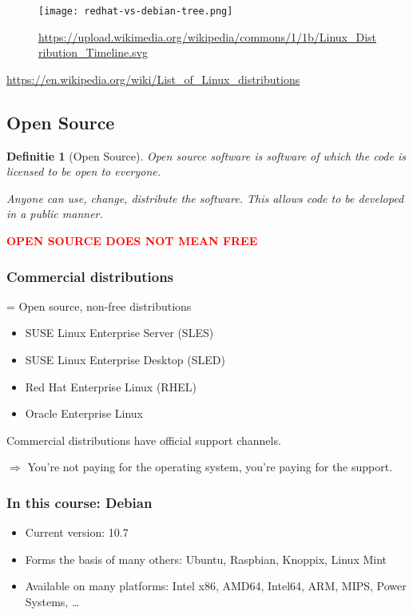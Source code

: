 \documentclass{article}
\newtheorem{theorem}{Definitie}[section]
\begin{document}
\begin{figure}[H]
    \centering
    \texttt{[image: redhat-vs-debian-tree.png]}
    \caption{\url{https://upload.wikimedia.org/wikipedia/commons/1/1b/Linux_Distribution_Timeline.svg}}
\end{figure}

\url{https://en.wikipedia.org/wiki/List_of_Linux_distributions}

\subsection{Open Source}

\begin{theorem}[Open Source]
Open source software is software of which the code is licensed to be open to everyone. 

Anyone can use, change, distribute the software. This allows code to be developed in a public manner.
\end{theorem}

\textbf{\textcolor{red}{OPEN SOURCE DOES NOT MEAN FREE}}

\subsubsection{Commercial distributions}

= Open source, non-free distributions

\begin{itemize}
    \item SUSE Linux Enterprise Server (SLES)
    \item SUSE Linux Enterprise Desktop (SLED)
    \item Red Hat Enterprise Linux (RHEL)
    \item Oracle Enterprise Linux
\end{itemize}

Commercial distributions have official support channels.

$\Rightarrow$ You're not paying for the operating system, you're paying for the support.

\subsubsection{In this course: Debian}


\begin{itemize}
    \item Current version: 10.7
    \item Forms the basis of many others: Ubuntu, Raspbian, Knoppix, Linux Mint
    \item Available on many platforms: Intel x86, AMD64, Intel64, ARM, MIPS, Power Systems, \dots
\end{itemize}
\end{document}
